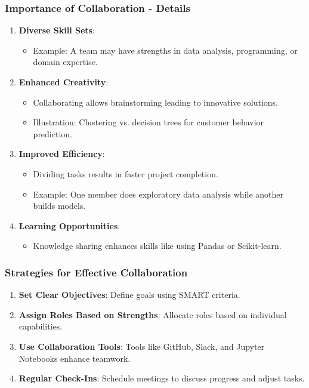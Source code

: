 \documentclass[aspectratio=169]{beamer}
\begin{document}
\begin{frame}[fragile]
    \frametitle{Importance of Collaboration - Details}
    \begin{enumerate}
        \item \textbf{Diverse Skill Sets}: 
            \begin{itemize}
                \item Example: A team may have strengths in data analysis, programming, or domain expertise.
            \end{itemize}
  
        \item \textbf{Enhanced Creativity}: 
            \begin{itemize}
                \item Collaborating allows brainstorming leading to innovative solutions. 
                \item Illustration: Clustering vs. decision trees for customer behavior prediction.
            \end{itemize}
  
        \item \textbf{Improved Efficiency}: 
            \begin{itemize}
                \item Dividing tasks results in faster project completion.
                \item Example: One member does exploratory data analysis while another builds models.
            \end{itemize}

        \item \textbf{Learning Opportunities}:
            \begin{itemize}
                \item Knowledge sharing enhances skills like using Pandas or Scikit-learn.
            \end{itemize}
    \end{enumerate}
\end{frame}

\begin{frame}[fragile]
    \frametitle{Strategies for Effective Collaboration}
    \begin{enumerate}
        \item \textbf{Set Clear Objectives}: Define goals using SMART criteria.
        \item \textbf{Assign Roles Based on Strengths}: Allocate roles based on individual capabilities.
        \item \textbf{Use Collaboration Tools}: Tools like GitHub, Slack, and Jupyter Notebooks enhance teamwork.
        \item \textbf{Regular Check-Ins}: Schedule meetings to discuss progress and adjust tasks.
    \end{enumerate}
\end{frame}
\end{document}
